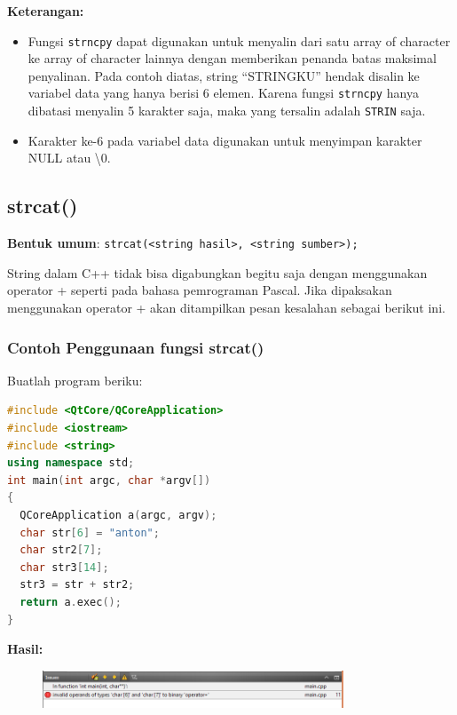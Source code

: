 \textbf{Keterangan:}

\begin{itemize}

\item
  Fungsi \texttt{strncpy} dapat digunakan untuk menyalin dari satu array
  of character ke array of character lainnya dengan memberikan penanda
  batas maksimal penyalinan. Pada contoh diatas, string ``STRINGKU''
  hendak disalin ke variabel data yang hanya berisi 6 elemen. Karena
  fungsi \texttt{strncpy} hanya dibatasi menyalin 5 karakter saja, maka
  yang tersalin adalah \texttt{STRIN} saja.
\item
  Karakter ke-6 pada variabel data digunakan untuk menyimpan karakter
 NULL atau \textbackslash0.
\end{itemize}

\subsection{strcat()}\label{strcat}

\textbf{Bentuk umum}:
\texttt{strcat(\textless{}string\ hasil\textgreater{},\ \textless{}string\ sumber\textgreater{});}

String dalam C++ tidak bisa digabungkan begitu saja dengan menggunakan
operator + seperti pada bahasa pemrograman Pascal. Jika dipaksakan
menggunakan operator + akan ditampilkan pesan kesalahan sebagai berikut
ini.

\subsubsection*{Contoh  Penggunaan fungsi strcat()}

Buatlah program beriku:

\begin{lstlisting}[language=c++, caption=Penggunaan fungsi strcat(), label=contoh3-22]
#include <QtCore/QCoreApplication>
#include <iostream>
#include <string>
using namespace std;
int main(int argc, char *argv[])
{
  QCoreApplication a(argc, argv);
  char str[6] = "anton";
  char str2[7];
  char str3[14];
  str3 = str + str2;
  return a.exec();
}
\end{lstlisting}

\textbf{Hasil:}

\begin{figure}[htbp]
\centering
\includegraphics[width=0.8\textwidth]{../manuscript/images/capture3-6.PNG}

\end{figure}

